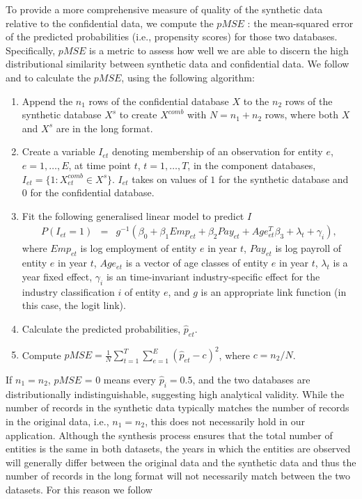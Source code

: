 \documentclass[10pt,twoside]{article}
\begin{document}
To provide a more comprehensive measure of  quality of the synthetic data relative to the confidential data, we compute the $pMSE$ \parencite[propensity score mean-squared error,][]{Woo_Reiter_Oganian_Karr_2009,SnokeSlavkovic2018,Snoke_RSSA2018}: the mean-squared error of the predicted probabilities (i.e., propensity scores) for those two databases. Specifically, $pMSE$ is a metric to assess how well we are able to discern the high distributional similarity between synthetic data and confidential data. We follow  \textcite{Woo_Reiter_Oganian_Karr_2009} and \textcite{SnokeSlavkovic2018} to calculate the $pMSE$, using the following algorithm:  
\begin{enumerate}
    \item Append the $n_1$ rows of the confidential database $X$ to the $n_2$ rows of the synthetic database $X^s$ to create $X^{comb}$ with $N=n_1 + n_2$ rows, where both $X$ and $X^s$ are in the long format.
    \item Create a variable $I_{et}$ denoting membership of an observation for entity $e$, $e=1,\ldots,E$, at time point $t$, $t=1,\ldots,T$, in the component databases,  $I_{et}=\{1: X^{comb}_{et} \in X^s\}$. $I_{et}$ takes on values of $1$ for the synthetic database and $0$ for the confidential database. 
    \item Fit the following generalised linear model to predict $I$
    \begin{eqnarray}	
        P(I_{et}=1) & = &g^{-1}(\beta_0 + \beta_{1} Emp_{et} + \beta_{2} Pay_{et} + Age_{et}^{T}\beta_{3} + \lambda_t + \gamma_i), \label{pMSE}
     \end{eqnarray}
         where $Emp_{et}$ is  log employment  of entity $e$ in year $t$, $Pay_{et}$ is  log payroll of entity $e$ in year $t$, $Age_{et}$ is a vector of age classes of entity $e$ in year $t$, $\lambda_t$ is a year fixed effect, $\gamma_i$ is an time-invariant industry-specific effect for the industry classification $i$ of entity $e$, and $g$ is an appropriate link function (in this case, the logit link).
\item Calculate the predicted probabilities, $\hat{p}_{et}$.
    \item Compute  $pMSE=\frac{1}{N}\sum_{t=1}^T\sum_{e=1}^E(\hat{p}_{et} - c)^2$, where $c=n_2/N$.
\end{enumerate}
If $n_1 = n_2$, $pMSE$ = 0 means every $\hat{p}_i = 0.5$, and the two databases are distributionally indistinguishable, suggesting  high analytical validity. While the number of records in the synthetic data typically matches the number of records in the original data, i.e., $n_1 = n_2$, this does not necessarily hold in our application. Although the synthesis process ensures that the total number of entities is the same in both datasets, the years in which the entities are observed will generally differ between the original data and the synthetic data and thus the number of records in the long format will not necessarily match between the two datasets. For this reason we follow 
\end{document}
